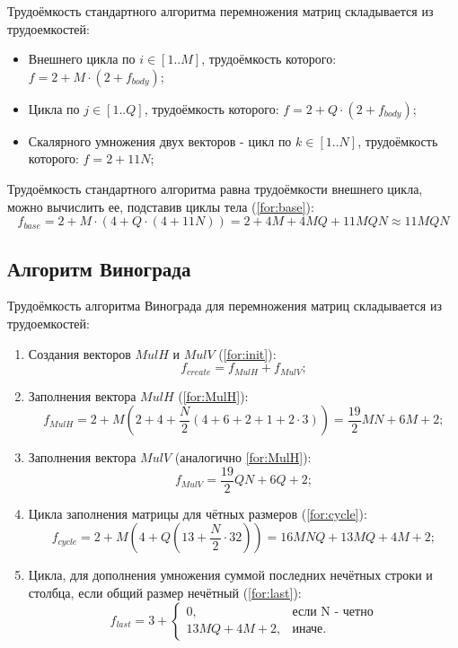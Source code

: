 Трудоёмкость стандартного алгоритма перемножения матриц складывается из трудоемкостей:
\begin{itemize}
	\item Внешнего цикла по $i \in [1..M]$, трудоёмкость которого: $f = 2 + M \cdot (2 + f_{body})$;
	\item Цикла по $j \in [1..Q]$, трудоёмкость которого: $f = 2 + Q \cdot (2 + f_{body})$;
	\item Скалярного умножения двух векторов - цикл по $k \in [1..N]$, трудоёмкость которого: $f = 2 + 11N$;
\end{itemize}

Трудоёмкость стандартного алгоритма равна трудоёмкости внешнего цикла, можно вычислить ее, подставив циклы тела (\ref{for:base}):
\begin{equation}
	\label{for:base}
	f_{base} = 2 + M \cdot (4 + Q \cdot (4 + 11N)) = 2 + 4M + 4MQ + 11MQN \approx 11MQN
\end{equation}

\subsection{Алгоритм Винограда}

Трудоёмкость алгоритма Винограда для перемножения матриц складывается из трудоемкостей:

\begin{enumerate}
	\item Создания векторов $MulH$ и $MulV$ (\ref{for:init}):
	\begin{equation}
	\label{for:init}
	f_{create} = f_{MulH} + f_{MulV};
	\end{equation}
	
	\item Заполнения вектора $MulH$ (\ref{for:MulH}):
	\begin{equation}
	\label{for:MulH}
	f_{MulH}=2+M(2+4+\frac{N}{2}(4+6+2+1+2\cdot3))=\frac{19}{2}MN+6M+2;
	\end{equation}
	
	\item Заполнения вектора $MulV$ (аналогично \ref{for:MulH}):
	\begin{equation}
	\label{for:MulV}
	f_{MulV}=\frac{19}{2}QN+6Q+2;
	\end{equation}
	
	\item Цикла заполнения матрицы для чётных размеров (\ref{for:cycle}):
	\begin{equation}
	\label{for:cycle}
	f_{cycle}=2+M(4+Q(13+\frac{N}{2}\cdot32))=16MNQ+13MQ+4M+2;
	\end{equation}
	
	\item Цикла, для дополнения умножения суммой последних нечётных строки и столбца, если общий размер нечётный (\ref{for:last}):
	\begin{equation}
	\label{for:last}
	f_{last} = 3 + \begin{cases}
	0, & \text{если N - четно}\\
	13MQ+4M+2, & \text{иначе.}
	\end{cases}
	\end{equation}
\end{enumerate}

